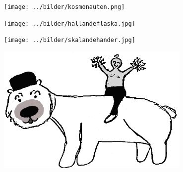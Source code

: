 



\sclearpage

\sclearpage




%
\sclearpage


\sclearpage


\sclearpage

\sclearpage

\begin{intersong}
\begin{center}
\texttt{[image: ../bilder/kosmonauten.png]} 
\end{center}
\vspace{10mm}
\end{intersong}

\sclearpage
\sclearpage


\sclearpage

\sclearpage

\begin{intersong}
\begin{center}
\texttt{[image: ../bilder/hallandeflaska.jpg]} 
\end{center}
\end{intersong}
\sclearpage





\sclearpage

\sclearpage

\begin{intersong}
	\begin{center}
		\texttt{[image: ../bilder/skalandehander.jpg]} 
	\end{center}
\end{intersong}
\sclearpage

\begin{intersong}
	\begin{center}
		\includegraphics[width=0.7\textwidth]{../bilder/fardigabilder/CamillasFardigaBilder/Isbjorn2.png} 
	\end{center}
	\vspace{5mm}
\end{intersong}

